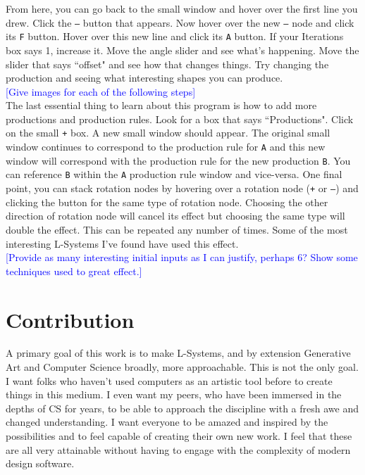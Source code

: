\documentclass[12pt,twoside]{reedthesis}
\newcommand{\code}[1]{\texttt{#1}}
\begin{document}
	From here, you can go back to the small window and hover over the first line you drew. Click the \code{–} button that appears. Now hover over the new \code{–} node and click its \code{F} button. Hover over this new line and click its \code{A} button. If your Iterations box says 1, increase it. Move the angle slider and see what's happening. Move the slider that says ``offset" and see how that changes things. Try changing the production and seeing what interesting shapes you can produce.\\
	
	\textcolor{blue}{[Give images for each of the following steps]}\\
	
	The last essential thing to learn about this program is how to add more productions and production rules. Look for a box that says ``Productions". Click on the small \code{+} box. A new small window should appear. The original small window continues to correspond to the production rule for \code{A} and this new window will correspond with the production rule for the new production \code{B}. You can reference \code{B} within the \code{A} production rule window and vice-versa. One final point, you can stack rotation nodes by hovering over a rotation node (\code{+} or \code{–}) and clicking the button for the same type of rotation node. Choosing the other direction of rotation node will cancel its effect but choosing the same type will double the effect. This can be repeated any number of times. Some of the most interesting L-Systems I've found have used this effect.\\
	
	\textcolor{blue}{[Provide as many interesting initial inputs as I can justify, perhaps 6? Show some techniques used to great effect.]}

\chapter{Contribution}
	A primary goal of this work is to make L-Systems, and by extension Generative Art and Computer Science broadly, more approachable. This is not the only goal. I want folks who haven't used computers as an artistic tool before to create things in this medium. I even want my peers, who have been immersed in the depths of CS for years, to be able to approach the discipline with a fresh awe and changed understanding. I want everyone to be amazed and inspired by the possibilities and to feel capable of creating their own new work.  I feel that these are all very attainable without having to engage with the complexity of modern design software.
	
\end{document}
